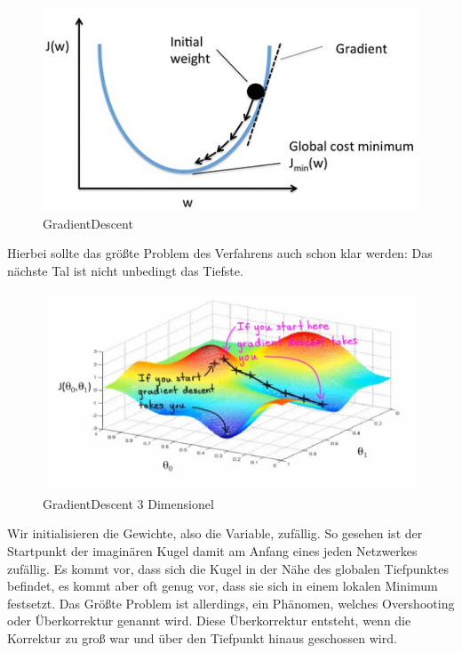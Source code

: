 \documentclass[12pt]{article}
\begin{document}
\begin{figure}[H]
\centering
\includegraphics[scale=0.70]{./Images/Pasted image 20230915145401.png}
\caption{GradientDescent}
\label{GradientDescent}
\end{figure}
Hierbei sollte das größte Problem des Verfahrens auch schon klar werden: Das nächste Tal ist nicht unbedingt das Tiefste.
\begin{figure}[H]
\centering
\includegraphics[scale=0.40]{./Images/Pasted image 20230915223421.png}
\caption{GradientDescent 3 Dimensionel}
\label{GradientDescent 3 Dimensionel}
\end{figure}
Wir initialisieren die Gewichte, also die Variable, zufällig. So gesehen ist der Startpunkt der imaginären Kugel damit am Anfang eines jeden Netzwerkes zufällig. Es kommt vor, dass sich die Kugel in der Nähe des globalen Tiefpunktes befindet, es kommt aber oft genug vor, dass sie sich in einem lokalen Minimum festsetzt. 
Das Größte Problem ist allerdings, ein Phänomen, welches Overshooting oder Überkorrektur genannt wird. Diese Überkorrektur entsteht, wenn die Korrektur zu groß war und über den Tiefpunkt hinaus geschossen wird.
\end{document}
